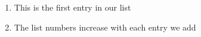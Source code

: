 \documentclass{article}
\begin{document}
\begin{enumerate}
    \item This is the first entry in our list
    \item The list numbers increase with each entry we add
\end{enumerate}
\end{document}
